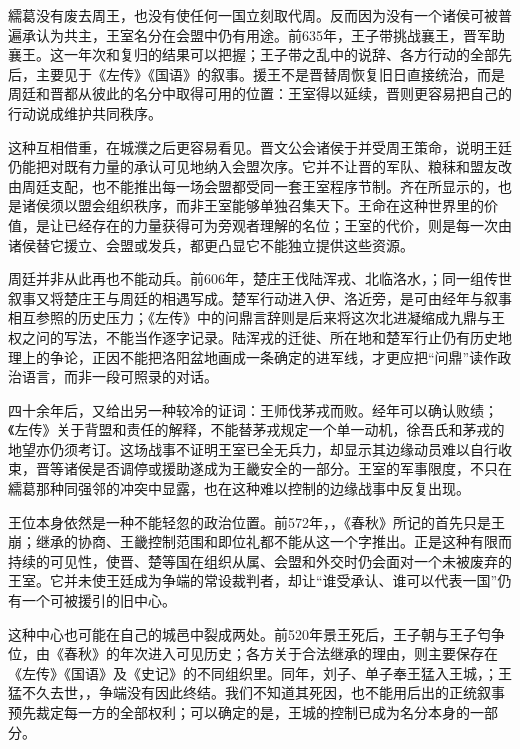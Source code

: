 繻葛没有废去周王，也没有使任何一国立刻取代周。反而因为没有一个诸侯可被普遍承认为共主，王室名分在会盟中仍有用途。前635年，王子带挑战襄王，晋军助襄王。这一年次和复归的结果可以把握；王子带之乱中的说辞、各方行动的全部先后，主要见于《左传》《国语》的叙事。援王不是晋替周恢复旧日直接统治，而是周廷和晋都从彼此的名分中取得可用的位置：王室得以延续，晋则更容易把自己的行动说成维护共同秩序。

这种互相借重，在城濮之后更容易看见。晋文公会诸侯于并受周王策命，说明王廷仍能把对既有力量的承认可见地纳入会盟次序。它并不让晋的军队、粮秣和盟友改由周廷支配，也不能推出每一场会盟都受同一套王室程序节制。齐在所显示的，也是诸侯须以盟会组织秩序，而非王室能够单独召集天下。王命在这种世界里的价值，是让已经存在的力量获得可为旁观者理解的名位；王室的代价，则是每一次由诸侯替它援立、会盟或发兵，都更凸显它不能独立提供这些资源。

周廷并非从此再也不能动兵。前606年，楚庄王伐陆浑戎、北临洛水，；同一组传世叙事又将楚庄王与周廷的相遇写成。楚军行动进入伊、洛近旁，是可由经年与叙事相互参照的历史压力；《左传》中的问鼎言辞则是后来将这次北进凝缩成九鼎与王权之问的写法，不能当作逐字记录。陆浑戎的迁徙、所在地和楚军行止仍有历史地理上的争论，正因不能把洛阳盆地画成一条确定的进军线，才更应把“问鼎”读作政治语言，而非一段可照录的对话。

四十余年后，又给出另一种较冷的证词：王师伐茅戎而败。经年可以确认败绩；《左传》关于背盟和责任的解释，不能替茅戎规定一个单一动机，徐吾氏和茅戎的地望亦仍须考订。这场战事不证明王室已全无兵力，却显示其边缘动员难以自行收束，晋等诸侯是否调停或援助遂成为王畿安全的一部分。王室的军事限度，不只在繻葛那种同强邻的冲突中显露，也在这种难以控制的边缘战事中反复出现。

王位本身依然是一种不能轻忽的政治位置。前572年，，《春秋》所记的首先只是王崩；继承的协商、王畿控制范围和即位礼都不能从这一个字推出。正是这种有限而持续的可见性，使晋、楚等国在组织从属、会盟和外交时仍会面对一个未被废弃的王室。它并未使王廷成为争端的常设裁判者，却让“谁受承认、谁可以代表一国”仍有一个可被援引的旧中心。

这种中心也可能在自己的城邑中裂成两处。前520年景王死后，王子朝与王子匄争位，由《春秋》的年次进入可见历史；各方关于合法继承的理由，则主要保存在《左传》《国语》及《史记》的不同组织里。同年，刘子、单子奉王猛入王城，；王猛不久去世，，争端没有因此终结。我们不知道其死因，也不能用后出的正统叙事预先裁定每一方的全部权利；可以确定的是，王城的控制已成为名分本身的一部分。

